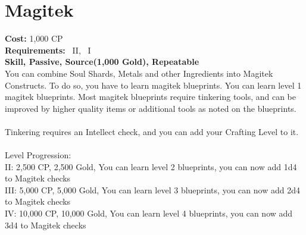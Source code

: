 \section{Magitek}\label{perk:magitek}
\textbf{Cost:} 1,000 CP\\
\textbf{Requirements:}~ II,~ I\\
\textbf{Skill, Passive, Source(1,000 Gold), Repeatable}\\
You can combine Soul Shards, Metals and other Ingredients into Magitek Constructs.
To do so, you have to learn magitek blueprints.
You can learn level 1 magitek blueprints.
Most magitek blueprints require tinkering tools, and can be improved by higher quality items or additional tools as noted on the blueprints.\\
\\
Tinkering requires an Intellect check, and you can add your Crafting Level to it.\\
\\
Level Progression:\\
II: 2,500 CP, 2,500 Gold, You can learn level 2 blueprints, you can now add 1d4 to Magitek checks\\
III: 5,000 CP, 5,000 Gold, You can learn level 3 blueprints, you can now add 2d4 to Magitek checks\\
IV: 10,000 CP, 10,000 Gold, You can learn level 4 blueprints, you can now add 3d4 to Magitek checks\\